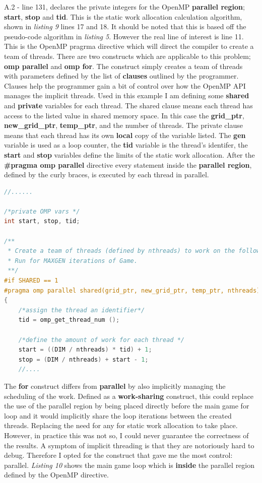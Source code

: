 \documentclass[11pt]{article} %
\begin{document}
A.2 - line 131, declares the private integers for the OpenMP {\bf parallel region}; {\bf start}, {\bf stop} and {\bf tid}. This is the static work allocation calculation algorithm, shown in {\it listing 9} lines 17 and 18. It should be noted that this is based off the pseudo-code algorithm in {\it listing 5}. However the real line of interest is line 11. This is the OpenMP pragrma directive which will direct the compiler to create a team of threads. There are two constructs which are applicable to this problem; {\bf omp parallel} and {\bf omp for}. The construct simply creates a team of threads with parameters defined by the list of {\bf clauses} outlined by the programmer. Clauses help the programmer gain a bit of control over how the OpenMP API manages the implicit threads. Used in this example I am defining some {\bf shared} and {\bf private} variables for each thread. The shared clause means each thread has access to the listed value in shared memory space. In this case the {\bf grid\_ptr}, {\bf new\_grid\_ptr}, {\bf temp\_ptr}, and the number of threads. The private clause means that each thread has its own {\bf local} copy of the variable listed. The {\bf gen} variable is used as a loop counter, the {\bf tid} variable is the thread's identifer, the {\bf start} and {\bf stop} variables define the limits of the static work allocation. After the {\bf \#pragma omp parallel} directive every statement inside the {\bf parallel region}, defined by the curly braces, is executed by each thread in parallel. 
\begin{lstlisting}[language=C, caption={OpenMP directive use and thread creation}]
//......

/*private OMP vars */
int start, stop, tid;

/**
 * Create a team of threads (defined by nthreads) to work on the following code.
 * Run for MAXGEN iterations of Game.
 **/
#if SHARED == 1
#pragma omp parallel shared(grid_ptr, new_grid_ptr, temp_ptr, nthreads) private(gen, tid, start, stop)  num_threads(nthreads)
{
	/*assign the thread an identifier*/
    tid = omp_get_thread_num ();

    /*define the amount of work for each thread */
    start = ((DIM / nthreads) * tid) + 1;
    stop = (DIM / nthreads) + start - 1;
    //....
\end{lstlisting}
The {\bf for} construct differs from {\bf parallel} by also implicitly managing the scheduling of the work. Defined as a {\bf work-sharing} construct, this could replace the use of the parallel region by being placed directly before the main game for loop and it would implicitly share the loop iterations between the created threads. Replacing the need for any for static work allocation to take place. However, in practice this was not so, I could never guarantee the correctness of the results. A symptom of implicit threading is that they are notoriously hard to debug. Therefore I opted for the construct that gave me the most control: parallel. {\it Listing 10} shows the main game loop which is {\bf inside} the parallel region defined by the OpenMP directive. 
\end{document}
